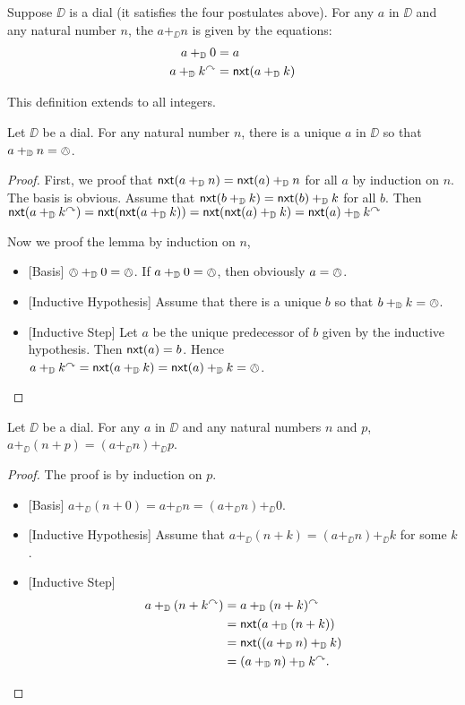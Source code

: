 \begin{defn}
	Suppose $\DD$ is a dial (it satisfies the four postulates above). For any $a$ in $\DD$ and any natural number $n$, the  $a+_\DD n$ is given by the equations:
	\begin{align*}
		a +_{\mathbb D} 0 &= a\\
		a +_{\mathbb D} k^\curvearrowright &= \mathord{\textsf{nxt}}(a+_{\mathbb D} k)
	\end{align*}
\end{defn}

This definition extends to all integers.

\begin{lem}
	Let $\DD$ be a dial.
	For any natural number $n$, there is a unique $a$ in $\DD$ so that $a+_{\mathbb D} n = \owedge$.
	
	\begin{proof}
		First, we proof that $\mathord{\textsf{nxt}}(a +_{\mathbb D} n) = \mathord{\textsf{nxt}}(a) +_{\mathbb D} n$ for all $a$ by induction on $n$. The basis is obvious. Assume that $\mathord{\textsf{nxt}}(b +_{\mathbb D} k) = \mathord{\textsf{nxt}}(b) +_{\mathbb D} k$ for all $b$. Then $\mathord{\textsf{nxt}}(a +_{\mathbb D} k^\curvearrowright) = \mathord{\textsf{nxt}}(\mathord{\textsf{nxt}}(a+_{\mathbb D} k)) = \mathord{\textsf{nxt}}(\mathord{\textsf{nxt}}(a) +_{\mathbb D} k) = \mathord{\textsf{nxt}}(a) +_{\mathbb D} k^\curvearrowright$
		
		Now we proof the lemma by induction on $n$,
		\begin{itemize}
			\item{}[Basis] $\owedge +_{\mathbb D} 0 = \owedge$. If $a +_{\mathbb D} 0 = \owedge$, then obviously $a=\owedge$.
			\item{}[Inductive Hypothesis] Assume that there is a unique $b$ so that $b +_{\mathbb D} k = \owedge$.
			\item{}[Inductive Step] Let $a$ be the unique predecessor of $b$ given by the inductive hypothesis. Then $\mathord{\textsf{nxt}}(a)=b$. Hence $a +_{\mathbb D} k^\curvearrowright = \mathord{\textsf{nxt}}(a +_{\mathbb D} k) = \mathord{\textsf{nxt}}(a) +_{\mathbb D} k = \owedge$. 
		\end{itemize}
	\end{proof}
\end{lem}


\begin{lem}
	Let $\DD$ be a dial.
	For any $a$ in $\DD$ and any natural numbers $n$ and $p$, $a +_\DD (n+p) = (a +_\DD n) +_\DD p$.
	
	\begin{proof}
		The proof is by induction on $p$. 
		\begin{itemize}
			\item{}[Basis] $a +_\DD (n+0) = a +_\DD n = (a +_\DD n) +_\DD 0$.
			\item{}[Inductive Hypothesis] Assume that $a +_\DD (n+k) = (a +_\DD n) +_\DD k$ for some $k$.
			\item{}[Inductive Step] 
			\begin{align*}
				a +_{\mathbb D} (n+k^\curvearrowright) &= a +_{\mathbb D} (n+k)^\curvearrowright\\ 
				                 &= \mathord{\textsf{nxt}}(a +_{\mathbb D} (n+k))\\
				                 &= \mathord{\textsf{nxt}}((a +_{\mathbb D} n) +_{\mathbb D} k)\\
				                 &= (a +_{\mathbb D} n) +_{\mathbb D} k^\curvearrowright.
			\end{align*}
		\end{itemize}
	\end{proof}
\end{lem}

